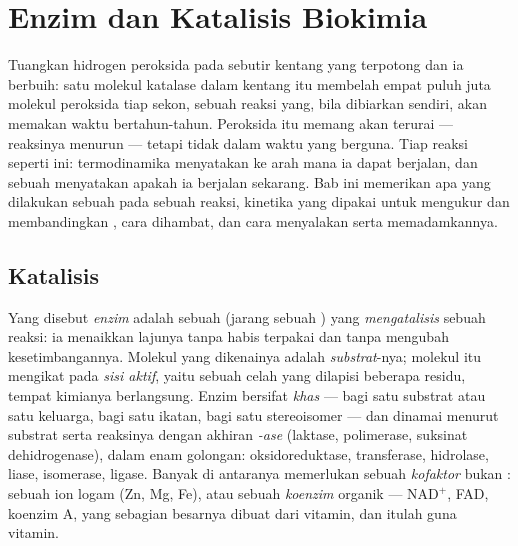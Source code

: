 \chapter{Enzim dan Katalisis Biokimia}\label{ch:b1:enzymes}

Tuangkan hidrogen peroksida pada sebutir kentang yang terpotong dan ia
berbuih: satu molekul katalase dalam  kentang itu membelah empat
puluh juta molekul peroksida tiap sekon, sebuah reaksi yang, bila
dibiarkan sendiri, akan memakan waktu bertahun-tahun. Peroksida itu
memang akan terurai --- reaksinya menurun --- tetapi tidak dalam waktu
yang berguna. Tiap reaksi  seperti ini: termodinamika menyatakan ke
arah mana ia dapat berjalan, dan sebuah \emph{} menyatakan apakah
ia berjalan sekarang. Bab ini memerikan apa yang dilakukan sebuah 
pada sebuah reaksi, kinetika yang dipakai untuk mengukur dan
membandingkan , cara  dihambat, dan cara  menyalakan serta
memadamkannya.

\section{Katalisis}

\begin{definition}\label{def:b1:enzymes:enzyme}
Yang disebut \emph{enzim} adalah sebuah  (jarang
sebuah ) yang \emph{mengatalisis} sebuah reaksi: ia menaikkan
lajunya tanpa habis terpakai dan tanpa mengubah kesetimbangannya.
Molekul yang dikenainya adalah \emph{substrat}-nya;
molekul itu mengikat pada \emph{sisi aktif}, yaitu
sebuah celah yang dilapisi beberapa residu, tempat kimianya
berlangsung. Enzim bersifat \emph{khas} --- bagi satu substrat atau satu
keluarga, bagi satu ikatan, bagi satu stereoisomer --- dan dinamai
menurut substrat serta reaksinya dengan akhiran \emph{-ase} (laktase,
 polimerase, suksinat dehidrogenase), dalam enam golongan:
oksidoreduktase, transferase, hidrolase, liase, isomerase, ligase.
Banyak di antaranya memerlukan sebuah \emph{kofaktor}
bukan : sebuah ion logam (Zn, Mg, Fe), atau sebuah
\emph{koenzim} organik --- $\mathrm{NAD^+}$, FAD,
koenzim A, yang sebagian besarnya dibuat dari vitamin, dan itulah guna
vitamin.
\end{definition}

